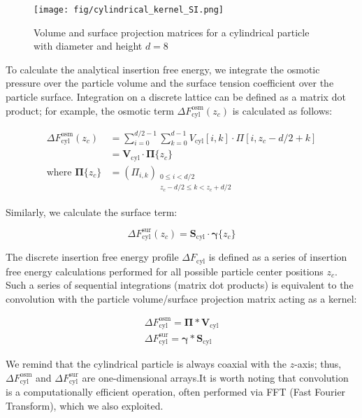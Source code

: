 \documentclass[10pt, a4paper]{article}
\begin{document}
\begin{multicols}{2}
\begin{figure}[H]
    \centering
    \texttt{[image: fig/cylindrical\_kernel\_SI.png]}
    \caption{Volume and surface projection matrices for a cylindrical particle with diameter and height $d = 8$}
    \label{fig:cylindrical_kernel_SI}
\end{figure}

To calculate the analytical insertion free energy, we integrate the osmotic pressure over the particle volume and the surface tension coefficient over the particle surface.
Integration on a discrete lattice can be defined as a matrix dot product; for example, the osmotic term $\Delta F_{\textrm{cyl}}^{\textrm{osm}}(z_c)$ is calculated as follows:

\begin{equation}\label{eq:cyl_fe_osm}
    \begin{split}
        \Delta F_{\textrm{cyl}}^{\textrm{osm}}(z_c) &= \sum_{i=0}^{d/2 - 1} \sum_{k=0}^{d - 1} V_{\textrm{cyl}}[i, k] \cdot \Pi[i, z_c - d/2 + k] \\
        &= \mathbf{V}_{\textrm{cyl}} \cdot \boldsymbol{\Pi}\{z_c\} \\
        \text{where } \boldsymbol{\Pi}\{z_c\} &= \left( \Pi_{i, k} \right)_{\substack{0 \leq i < d/2 \\ z_c - d/2 \leq k < z_c + d/2}}
    \end{split}
\end{equation}

Similarly, we calculate the surface term:

\begin{equation}\label{eq:cyl_fe_sur}
    \Delta F_{\textrm{cyl}}^{\textrm{sur}}(z_c) = \mathbf{S}_{\textrm{cyl}} \cdot \boldsymbol{\gamma}\{z_c\}
\end{equation}

The discrete insertion free energy profile $\Delta F_{\textrm{cyl}}$ is defined as a series of insertion free energy calculations performed for all possible particle center positions $z_c$.
Such a series of sequential integrations (matrix dot products) is equivalent to the convolution with the particle volume/surface projection matrix acting as a kernel:

\begin{eqnarray}
    \Delta F_{\textrm{cyl}}^{\textrm{osm}} = \boldsymbol{\Pi} \ast \mathbf{V}_{\textrm{cyl}} \\
    \Delta F_{\textrm{cyl}}^{\textrm{sur}} = \boldsymbol{\gamma} \ast \mathbf{S}_{\textrm{cyl}}
\end{eqnarray}

We remind that the cylindrical particle is always coaxial with the $z$-axis; thus, $\Delta F_{\textrm{cyl}}^{\textrm{osm}}$ and $\Delta F_{\textrm{cyl}}^{\textrm{sur}}$ are one-dimensional arrays.It is worth noting that convolution is a computationally efficient operation, often performed via FFT (Fast Fourier Transform), which we also exploited.

\end{multicols}
\end{document}
